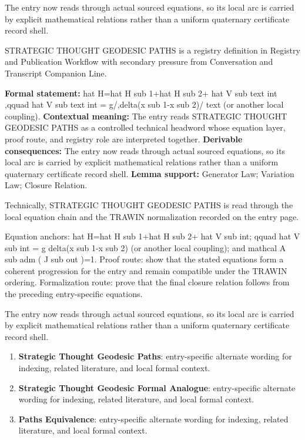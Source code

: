 The entry now reads through actual sourced equations, so its local arc is carried by explicit mathematical relations rather than a uniform quaternary certificate record shell.
\clearpage


\begingroup\small
{}
STRATEGIC THOUGHT GEODESIC PATHS is a registry definition in Registry and Publication Workflow with secondary pressure from Conversation and Transcript Companion Line.

\begingroup\footnotesize\setlength{\emergencystretch}{3em}\sloppy
\textbf{Formal statement:} hat H=hat H sub 1+hat H sub 2+ hat V sub text int ,qquad hat V sub text int = g/,delta(x sub 1-x sub 2)/ text (or another local coupling). \textbf{Contextual meaning:} The entry reads STRATEGIC THOUGHT GEODESIC PATHS as a controlled technical headword whose equation layer, proof route, and registry role are interpreted together. \textbf{Derivable consequences:} The entry now reads through actual sourced equations, so its local arc is carried by explicit mathematical relations rather than a uniform quaternary certificate record shell. \textbf{Lemma support:} Generator Law; Variation Law; Closure Relation.\par
\endgroup

Technically, STRATEGIC THOUGHT GEODESIC PATHS is read through the local equation chain and the TRAWIN normalization recorded on the entry page.

Equation anchors: hat H=hat H sub 1+hat H sub 2+ hat V sub int; qquad hat V sub int = g delta(x sub 1-x sub 2) (or another local coupling); and mathcal A sub adm ( J sub out )=1. Proof route: show that the stated equations form a coherent progression for the entry and remain compatible under the TRAWIN ordering. Formalization route: prove that the final closure relation follows from the preceding entry-specific equations.

The entry now reads through actual sourced equations, so its local arc is carried by explicit mathematical relations rather than a uniform quaternary certificate record shell.
\endgroup

\begin{enumerate}[leftmargin=1.6em,itemsep=6pt,topsep=4pt]
\item \textbf{Strategic Thought Geodesic Paths}: entry-specific alternate wording for indexing, related literature, and local formal context.
\item \textbf{Strategic Thought Geodesic Formal Analogue}: entry-specific alternate wording for indexing, related literature, and local formal context.
\item \textbf{Paths Equivalence}: entry-specific alternate wording for indexing, related literature, and local formal context.
\end{enumerate}

